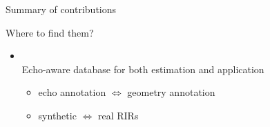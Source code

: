\begin{frame}[t]{Summary of contributions}
    \begin{block}{}
        \alert{Where to find them?}
        \begin{itemize}
            \item \dechorate
            \\Echo-aware database for both estimation and application{\footnotesize
            \begin{itemize}
                \item echo annotation $\Leftrightarrow$ geometry annotation
                \item synthetic $\Leftrightarrow$ real RIRs
            \end{itemize}}
        \end{itemize}
    \end{block}

\end{frame}

